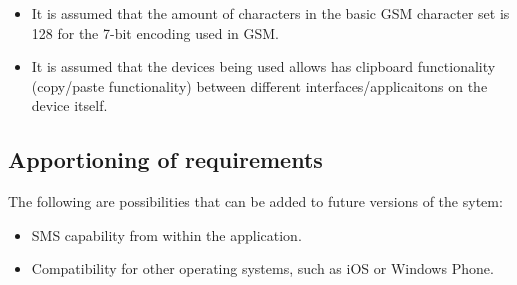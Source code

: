 \begin{itemize}
\item It is assumed that the amount of characters in the basic GSM character set is 128 for the 7-bit encoding used in GSM.
\item It is assumed that the devices being used allows has clipboard functionality (copy/paste functionality) between different interfaces/applicaitons on the device itself.
\end{itemize}

\subsection{Apportioning of requirements}
The following are possibilities that can be added to future versions of the sytem:
\begin{itemize}
\item SMS capability from within the application.
\item Compatibility for other operating systems, such as iOS or Windows Phone.
\end{itemize}
